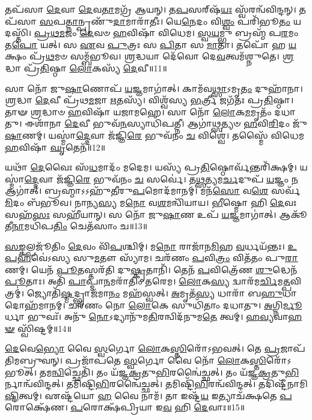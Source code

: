    𑌤𑌪᳴𑌸𑌾 \ul{𑌦𑍇}\-𑌵𑌾 \ul{𑌦𑍇}\-𑌵\-\ul{𑌤𑌾}\-𑌮𑌗𑍍𑌰᳴ 𑌆𑌯𑌨𑍍।
   𑌤\-\ul{𑌪}\-𑌸𑌰𑍍‌𑌷᳴\-\ul{𑌯𑌃} 𑌸𑍍𑌵᳴𑌰𑌨𑍍𑌵᳴𑌵𑌿𑌨𑍍𑌦𑌨𑍍।
   𑌤𑌪᳴𑌸𑌾 \ul{𑌸}\-𑌪\-\ul{𑌤𑍍𑌨𑌾}\-𑌨𑍍𑌪𑍍𑌰𑌣𑍁᳴\-\ul{𑌦𑌾}\-𑌮𑌾𑌰𑌾᳴𑌤𑍀𑌃।
   𑌯𑍇\-\ul{𑌨𑍇}\-𑌦𑌂 𑌵𑌿\-\ul{𑌶𑍍𑌵𑌂} 𑌪𑌰𑌿᳴𑌭𑍂\-\ul{𑌤𑌂} 𑌯𑌦𑌸𑍍𑌤𑌿᳴।
   \ul{𑌪𑍍𑌰}\-\-\ul{𑌥}\-\-\ul{𑌮}\-𑌜𑌂 \ul{𑌦𑍇}\-𑌵𑍞 \ul{𑌹}\-𑌵𑌿𑌷𑌾᳴ 𑌵𑌿𑌧𑍇𑌮।
   \ul{𑌸𑍍𑌵}\-\-\ul{𑌯}\-𑌮𑍍𑌭𑍁 𑌬𑍍𑌰𑌹𑍍𑌮᳴ 𑌪\-\ul{𑌰}\-𑌮𑌂 𑌤\-\ul{𑌪𑍋} 𑌯𑌤𑍍।
   𑌸 \ul{𑌏}\-𑌵 \ul{𑌪𑍁}\-𑌤𑍍𑌰𑌃 𑌸 \ul{𑌪𑌿}\-𑌤𑌾 𑌸 \ul{𑌮𑌾}\-𑌤𑌾।
   𑌤𑌪𑍋᳴ 𑌹 \ul{𑌯}\-𑌕𑍍𑌷𑌂 𑌪𑍍𑌰᳴\-\ul{𑌥}\-𑌮𑍞 𑌸𑌮𑍍𑌬᳴𑌭𑍂𑌵।
   \ul{𑌶𑍍𑌰}\-𑌦𑍍𑌧𑌯𑌾 𑌦𑍇᳴𑌵𑍋 𑌦𑍇\-\ul{𑌵}\-𑌤𑍍𑌵𑌮᳴𑌶𑍍𑌨𑍁𑌤𑍇।
   \ul{𑌶𑍍𑌰}\-𑌦𑍍𑌧𑌾 𑌪𑍍𑌰᳴\-\ul{𑌤𑌿}\-𑌷𑍍𑌠𑌾 \ul{𑌲𑍋}\-𑌕𑌸𑍍𑌯᳴ \ul{𑌦𑍇}\-𑌵𑍀॥11॥

   𑌸𑌾 𑌨𑍋᳴ 𑌜𑍁\-\ul{𑌷𑌾}\-𑌣𑍋𑌪᳴ \ul{𑌯}\-𑌜𑍍𑌞𑌮𑌾𑌗𑌾॑𑌤𑍍।
   𑌕𑌾𑌮᳴𑌵\-\ul{𑌥𑍍𑌸𑌾}\-𑌽𑌮𑍃\-\ul{𑌤𑌂} 𑌦𑍁𑌹𑌾᳴𑌨𑌾।
   \ul{𑌶𑍍𑌰}\-𑌦𑍍𑌧𑌾 \ul{𑌦𑍇}\-𑌵𑍀 𑌪𑍍𑌰᳴𑌥\-\ul{𑌮}\-𑌜𑌾 \ul{𑌋}\-𑌤𑌸𑍍𑌯᳴।
   𑌵𑌿𑌶𑍍𑌵᳴𑌸𑍍𑌯 \ul{𑌭}\-𑌰𑍍𑌤𑍍𑌰𑍀 𑌜𑌗᳴𑌤𑌃 𑌪𑍍𑌰\-\ul{𑌤𑌿}\-𑌷𑍍𑌠𑌾।
   𑌤𑌾𑍟 \ul{𑌶𑍍𑌰}\-𑌦𑍍𑌧𑌾𑍞 \ul{𑌹}\-𑌵𑌿𑌷𑌾᳴ 𑌯𑌜𑌾𑌮𑌹𑍇।
   𑌸𑌾 𑌨𑍋᳴ \ul{𑌲𑍋}\-𑌕\-\ul{𑌮}\-𑌮𑍃𑌤𑌂᳴ 𑌦𑌧𑌾𑌤𑍁।
   𑌈𑌶𑌾᳴𑌨𑌾 \ul{𑌦𑍇}\-𑌵𑍀 𑌭𑍁𑌵᳴\-\ul{𑌨}\-𑌸𑍍𑌯𑌾𑌧𑌿᳴𑌪𑌤𑍍𑌨𑍀।
   𑌆𑌗𑌾॑\-\ul{𑌥𑍍𑌸}\-𑌤𑍍𑌯𑍞 \ul{𑌹}\-𑌵𑌿\-\ul{𑌰𑌿}\-𑌦𑌂 𑌜𑍁᳴\-\ul{𑌷𑌾}\-𑌣𑌮𑍍।
   𑌯𑌸𑍍𑌮𑌾॑\-\ul{𑌦𑍍𑌦𑍇}\-𑌵𑌾 𑌜᳴𑌜𑍍𑌞𑌿\-\ul{𑌰𑍇} 𑌭𑍁𑌵᳴𑌨𑌂 \ul{𑌚} 𑌵𑌿𑌶𑍍𑌵𑍇॑।
   𑌤𑌸𑍍𑌮𑍈᳴ 𑌵𑌿𑌧𑍇𑌮 \ul{𑌹}\-𑌵𑌿𑌷𑌾᳴ \ul{𑌘𑍃}\-𑌤𑍇𑌨᳴॥12॥

   𑌯𑌥𑌾᳴ \ul{𑌦𑍇}\-𑌵𑍈𑌃 𑌸᳴\-\ul{𑌧}\-𑌮𑌾𑌦𑌂᳴ 𑌮𑌦𑍇𑌮।
   𑌯𑌸𑍍𑌯᳴ 𑌪𑍍𑌰\-\ul{𑌤𑌿}\-𑌷𑍍𑌠𑍋𑌰𑍍𑌵᳴𑌨𑍍𑌤𑌰𑌿᳴𑌕𑍍𑌷𑌮𑍍।
   𑌯𑌸𑍍𑌮𑌾॑\-\ul{𑌦𑍍𑌦𑍇}\-𑌵𑌾 𑌜᳴𑌜𑍍𑌞𑌿\-\ul{𑌰𑍇} 𑌭𑍁𑌵᳴𑌨𑌂 \ul{𑌚} 𑌸𑌰𑍍𑌵𑍇॑।
   𑌤\-\ul{𑌥𑍍𑌸}\-𑌤𑍍𑌯𑌮\-\ul{𑌰𑍍𑌚}\-𑌦𑍁𑌪᳴ \ul{𑌯}\-𑌜𑍍𑌞𑌂 \ul{𑌨} 𑌆𑌗𑌾॑𑌤𑍍।
   𑌬𑍍𑌰𑌹𑍍𑌮𑌾𑌽𑌽𑌹𑍁᳴\-\ul{𑌤𑍀}\-𑌰𑍁\-\ul{𑌪}\-𑌮𑍋𑌦᳴𑌮𑌾𑌨𑌮𑍍।
   𑌮𑌨᳴\-\ul{𑌸𑍋} 𑌵\-\ul{𑌶𑍇} 𑌸𑌰𑍍𑌵᳴\-\ul{𑌮𑌿}\-𑌦𑌂 𑌬᳴𑌭𑍂𑌵।
   𑌨𑌾𑌨𑍍𑌯\-\ul{𑌸𑍍𑌯} 𑌮\-\ul{𑌨𑍋} 𑌵\-\ul{𑌶}\-𑌮𑌨𑍍𑌵𑌿᳴𑌯𑌾𑌯।
   \ul{𑌭𑍀}\-𑌷𑍍𑌮𑍋 𑌹𑌿 \ul{𑌦𑍇}\-𑌵𑌃 𑌸𑌹᳴\-\ul{𑌸𑌃} 𑌸𑌹𑍀᳴𑌯𑌾𑌨𑍍।
   𑌸 𑌨𑍋᳴ 𑌜𑍁\-\ul{𑌷𑌾}\-𑌣 𑌉𑌪᳴ \ul{𑌯}\-𑌜𑍍𑌞𑌮𑌾𑌗𑌾॑𑌤𑍍।
   𑌆𑌕𑍂᳴𑌤𑍀\-\ul{𑌨𑌾}\-𑌮𑌧𑌿᳴𑌪\-\ul{𑌤𑌿𑌂} 𑌚𑍇𑌤᳴𑌸𑌾𑌂 𑌚॥13॥

   \ul{𑌸}\-\-\ul{𑌙𑍍𑌕}\-𑌲𑍍𑌪𑌜𑍂᳴𑌤𑌿𑌂 \ul{𑌦𑍇}\-𑌵𑌂 𑌵𑌿᳴\-\ul{𑌪}\-𑌶𑍍𑌚𑌿𑌮𑍍।
   𑌮\-\ul{𑌨𑍋} 𑌰𑌾𑌜𑌾᳴𑌨\-\ul{𑌮𑌿}\-𑌹 \ul{𑌵}\-𑌰𑍍𑌧𑌯᳴𑌨𑍍𑌤𑌃।
   \ul{𑌉}\-\-\ul{𑌪}\-\-\ul{𑌹}\-𑌵𑍇॑𑌽𑌸𑍍𑌯 𑌸𑍁\-\ul{𑌮}\-𑌤𑍗 𑌸𑍍𑌯𑌾᳴𑌮।
   𑌚𑌰᳴𑌣𑌂 \ul{𑌪}\-𑌵𑌿\-\ul{𑌤𑍍𑌰𑌂} 𑌵𑌿𑌤᳴𑌤𑌂 𑌪𑍁\-\ul{𑌰𑌾}\-𑌣𑌮𑍍।
   𑌯𑍇𑌨᳴ \ul{𑌪𑍂}\-𑌤𑌸𑍍𑌤𑌰᳴𑌤𑌿 𑌦𑍁\-\ul{𑌷𑍍𑌕𑍃}\-𑌤𑌾𑌨𑌿᳴।
   𑌤𑍇𑌨᳴ \ul{𑌪}\-𑌵𑌿𑌤𑍍𑌰𑍇᳴𑌣 \ul{𑌶𑍁}\-𑌦𑍍𑌧𑍇𑌨᳴ \ul{𑌪𑍂}\-𑌤𑌾𑌃।
   𑌅𑌤𑌿᳴ \ul{𑌪𑌾}\-𑌪𑍍𑌮𑌾\-\ul{𑌨}\-𑌮𑌰𑌾᳴𑌤𑌿𑌂 𑌤𑌰𑍇𑌮।
   \ul{𑌲𑍋}\-𑌕\-\ul{𑌸𑍍𑌯} 𑌦𑍍𑌵𑌾𑌰᳴𑌮\-\ul{𑌰𑍍𑌚𑌿}\-𑌮\-\ul{𑌤𑍍𑌪}\-𑌵𑌿𑌤𑍍𑌰𑌮𑍍॑।
   𑌜𑍍𑌯𑍋𑌤𑌿᳴\-\ul{𑌷𑍍𑌮}\-𑌦𑍍𑌭𑍍𑌰𑌾𑌜᳴𑌮𑌾\-\ul{𑌨𑌂} 𑌮𑌹᳴𑌸𑍍𑌵𑌤𑍍।
   \ul{𑌅}\-𑌮𑍃𑌤᳴\-\ul{𑌸𑍍𑌯} 𑌧𑌾𑌰𑌾᳴ 𑌬\-\ul{𑌹𑍁}\-𑌧𑌾 𑌦𑍋𑌹᳴𑌮𑌾𑌨𑌮𑍍।
   𑌚𑌰᳴𑌣𑌂 𑌨𑍋 \ul{𑌲𑍋}\-𑌕𑍇 𑌸𑍁𑌧𑌿᳴𑌤𑌾𑌂 𑌦𑌧𑌾𑌤𑍁।
   \ul{𑌅}\-𑌗𑍍𑌨𑌿\-\ul{𑌰𑍍𑌮𑍂}\-𑌰𑍍𑌧𑌾 𑌭𑍁𑌵𑌃᳴।
   𑌅𑌨𑍁᳴ \ul{𑌨𑍋}\-𑌽𑌦𑍍𑌯𑌾𑌨𑍁᳴𑌮\-\ul{𑌤𑌿}\-𑌰𑌨𑍍𑌵𑌿𑌦᳴𑌨𑍁𑌮\-\ul{𑌤𑍇} 𑌤𑍍𑌵𑌮𑍍।
   \ul{𑌹}\-\-\ul{𑌵𑍍𑌯}\-𑌵𑌾\-\ul{𑌹}\-\-\ul{𑍟} 𑌸𑍍𑌵𑌿᳴𑌷𑍍𑌟𑌮𑍍॥14॥\anuvakamend
  
   \ul{𑌦𑍇}\-𑌵𑍇\-\ul{𑌭𑍍𑌯𑍋} 𑌵𑍈 \ul{𑌸𑍍𑌵}\-𑌰𑍍𑌗𑍋 \ul{𑌲𑍋}\-𑌕\-\ul{𑌸𑍍𑌤𑌿}\-𑌰𑍋᳴𑌽𑌭𑌵𑌤𑍍।
   𑌤𑍇 \ul{𑌪𑍍𑌰}\-𑌜𑌾𑌪᳴𑌤𑌿𑌮𑌬𑍍𑌰𑍁𑌵𑌨𑍍।
   𑌪𑍍𑌰𑌜𑌾᳴𑌪𑌤𑍇 \ul{𑌸𑍍𑌵}\-𑌰𑍍𑌗𑍋 𑌵𑍈 𑌨𑍋᳴ \ul{𑌲𑍋}\-𑌕\-\ul{𑌸𑍍𑌤𑌿}\-𑌰𑍋᳴𑌽𑌭𑍂𑌤𑍍।
   𑌤𑌮\-\ul{𑌨𑍍𑌵𑌿}\-𑌚𑍍𑌛𑍇𑌤𑌿᳴।
   𑌤𑌂 𑌯᳴𑌜𑍍𑌞\-\ul{𑌕𑍍𑌰}\-𑌤𑍁\-\ul{𑌭𑌿}\-𑌰𑌨𑍍𑌵𑍈॑𑌚𑍍𑌛𑌤𑍍।
   𑌤𑌂 𑌯᳴𑌜𑍍𑌞\-\ul{𑌕𑍍𑌰}\-𑌤𑍁\-\ul{𑌭𑌿}\-𑌰𑍍𑌨𑌾𑌨𑍍𑌵᳴𑌵𑌿𑌨𑍍𑌦𑌤𑍍।
   𑌤𑌮𑌿𑌷𑍍𑌟𑌿\-\ul{𑌭𑌿}\-\-𑌰𑌨𑍍𑌵𑍈॑𑌚𑍍𑌛𑌤𑍍।
   𑌤𑌮𑌿𑌷𑍍𑌟𑌿᳴\-\ul{𑌭𑌿}\-𑌰𑌨𑍍𑌵᳴𑌵𑌿𑌨𑍍𑌦𑌤𑍍।
   𑌤𑌦𑌿𑌷𑍍𑌟𑍀᳴𑌨𑌾𑌮𑌿\-\ul{𑌷𑍍𑌟𑌿}\-𑌤𑍍𑌵𑌮𑍍।
   𑌏𑌷𑍍𑌟᳴𑌯𑍋 \ul{𑌹} 𑌵𑍈 𑌨𑌾𑌮᳴।
   𑌤𑌾 𑌇𑌷𑍍𑌟᳴\-\ul{𑌯} 𑌇𑌤𑍍𑌯𑌾𑌚᳴𑌕𑍍𑌷𑌤𑍇 \ul{𑌪}\-𑌰𑍋𑌕𑍍𑌷𑍇᳴𑌣।
   \ul{𑌪}\-𑌰𑍋𑌕𑍍𑌷᳴𑌪𑍍𑌰𑌿𑌯𑌾 𑌇\-\ul{𑌵} 𑌹𑌿 \ul{𑌦𑍇}\-𑌵𑌾𑌃॥15॥

